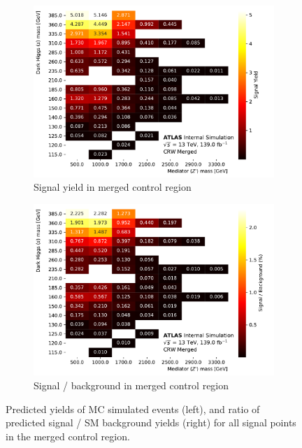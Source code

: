 \begin{figure}[htbp]
  \centering
  \begin{subfigure}{0.45\textwidth}
    \includegraphics[width=\textwidth]{Figures/5/SignalYields_CRW_Merged.pdf}
    \caption{Signal yield in merged \wjets control region}
    \label{fig:signal_yield_CRW_merged_CR}
    \end{subfigure} \hspace{1em}
  \begin{subfigure}{0.45\textwidth}
    \includegraphics[width=\textwidth]{Figures/5/SignalContaminations_CRW_Merged.pdf}
    \caption{Signal / background in merged \wjets control region}
    \label{fig:signal_over_bkg_CRW_merged_CR}
    \end{subfigure}
  \caption[Signal contaminations in merged SR and CRW]{Predicted yields of MC simulated events (left), and ratio of predicted signal / SM background yields (right) for all signal points in the merged \wjets control region.}
  \label{fig:signal_composition_CRW_merged}
\end{figure}

